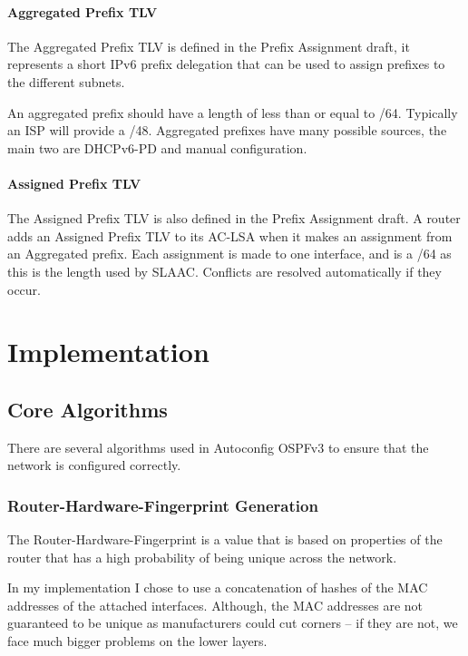 \documentclass[12pt]{report}
\begin{document}
\subsubsection{Aggregated Prefix TLV}
The Aggregated Prefix TLV is defined in the Prefix Assignment draft, it
represents a short IPv6 prefix delegation that can be used to assign prefixes
to the different subnets. 

An aggregated prefix should have a length of less than or equal to /64.
Typically an ISP will provide a /48. Aggregated prefixes have many possible
sources, the main two are DHCPv6-PD and manual configuration. 

\subsubsection{Assigned Prefix TLV}
The Assigned Prefix TLV is also defined in the Prefix Assignment draft. A
router adds an Assigned Prefix TLV to its AC-LSA when it makes an assignment
from an Aggregated prefix. Each assignment is made to one interface, and is a
/64 as this is the length used by SLAAC\@. Conflicts are resolved automatically
if they occur. 

\chapter{Implementation}

\section{Core Algorithms}
There are several algorithms used in Autoconfig OSPFv3 to ensure that the network
is configured correctly.

\subsection{Router-Hardware-Fingerprint Generation}
The Router-Hardware-Fingerprint is a value that is based on properties of
the router that has a high probability of being unique across the network. 

In my implementation I chose to use a concatenation of hashes of the MAC
 addresses of the
attached interfaces. Although, the MAC addresses are not guaranteed to be
unique as manufacturers could cut corners -- if they are not, we face much
bigger problems on the lower layers.
\end{document}
